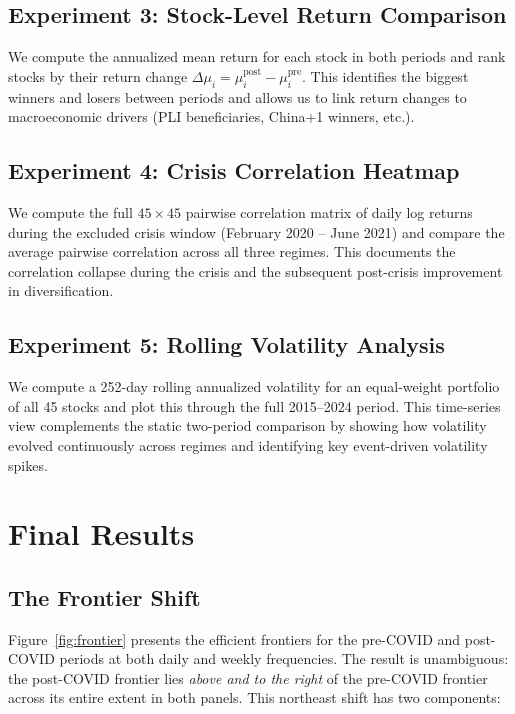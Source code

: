\documentclass[12pt,a4paper]{article}
\begin{document}
\subsection{Experiment 3: Stock-Level Return Comparison}

We compute the annualized mean return for each stock in both periods and rank stocks
by their return change $\Delta \mu_i = \mu_i^{\text{post}} - \mu_i^{\text{pre}}$.
This identifies the biggest winners and losers between periods and allows us to link
return changes to macroeconomic drivers (PLI beneficiaries, China$+$1 winners, etc.).

\subsection{Experiment 4: Crisis Correlation Heatmap}

We compute the full $45 \times 45$ pairwise correlation matrix of daily log returns
during the excluded crisis window (February 2020 -- June 2021) and compare the average
pairwise correlation across all three regimes. This documents the correlation collapse
during the crisis and the subsequent post-crisis improvement in diversification.

\subsection{Experiment 5: Rolling Volatility Analysis}

We compute a 252-day rolling annualized volatility for an equal-weight portfolio of
all 45 stocks and plot this through the full 2015--2024 period. This time-series view
complements the static two-period comparison by showing how volatility evolved
continuously across regimes and identifying key event-driven volatility spikes.

\section{Final Results}
\label{sec:results}

\subsection{The Frontier Shift}

Figure~\ref{fig:frontier} presents the efficient frontiers for the pre-COVID and
post-COVID periods at both daily and weekly frequencies. The result is unambiguous:
the post-COVID frontier lies \textit{above and to the right} of the pre-COVID frontier
across its entire extent in both panels. This northeast shift has two components:
\end{document}
